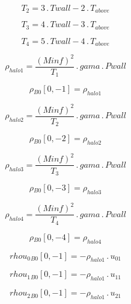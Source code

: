 \documentclass{article}
\begin{document}
\begin{dmath}T_{2} = 3 \,.\, Twall - 2 \,.\, T_{above}\end{dmath}

\begin{dmath}T_{3} = 4 \,.\, Twall - 3 \,.\, T_{above}\end{dmath}

\begin{dmath}T_{4} = 5 \,.\, Twall - 4 \,.\, T_{above}\end{dmath}

\begin{dmath}\rho_{halo 1} = \frac{\left(Minf \right)^{2}}{T_{1}} \,.\, gama \,.\, Pwall\end{dmath}

\begin{dmath}{\rho{_{B0}}}[{0,-1}] = \rho_{halo 1}\end{dmath}

\begin{dmath}\rho_{halo 2} = \frac{\left(Minf \right)^{2}}{T_{2}} \,.\, gama \,.\, Pwall\end{dmath}

\begin{dmath}{\rho{_{B0}}}[{0,-2}] = \rho_{halo 2}\end{dmath}

\begin{dmath}\rho_{halo 3} = \frac{\left(Minf \right)^{2}}{T_{3}} \,.\, gama \,.\, Pwall\end{dmath}

\begin{dmath}{\rho{_{B0}}}[{0,-3}] = \rho_{halo 3}\end{dmath}

\begin{dmath}\rho_{halo 4} = \frac{\left(Minf \right)^{2}}{T_{4}} \,.\, gama \,.\, Pwall\end{dmath}

\begin{dmath}{\rho{_{B0}}}[{0,-4}] = \rho_{halo 4}\end{dmath}

\begin{dmath}{rhou_{0}{_{B0}}}[{0,-1}] = - \rho_{halo 1} \,.\, u_{01}\end{dmath}

\begin{dmath}{rhou_{1}{_{B0}}}[{0,-1}] = - \rho_{halo 1} \,.\, u_{11}\end{dmath}

\begin{dmath}{rhou_{2}{_{B0}}}[{0,-1}] = - \rho_{halo 1} \,.\, u_{21}\end{dmath}
\end{document}
